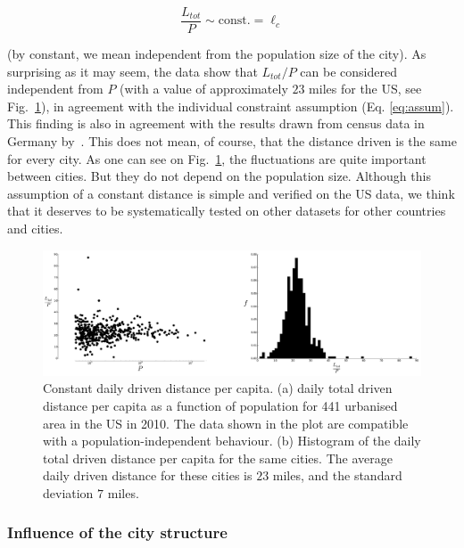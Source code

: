 \begin{equation} 
    \frac{L_{tot}}{P} \sim \text{const.} = \ell_c 
    \label{eq:assum}
\end{equation}

(by constant, we mean independent from the population size of the city). As
surprising as it may seem, the data show that $L_{tot}/P$ can be considered
 independent from $P$ (with a value of approximately $23$ miles for
the US, see Fig.~\ref{fig:LtotoverP}), in agreement with the individual
constraint assumption (Eq. \ref{eq:assum}). This finding is also in agreement
with the results drawn from census data in Germany by~\cite{Wilkerson:2013}.
This does not mean, of course, that the distance driven is the same for every
city. As one can see on Fig.~\ref{fig:LtotoverP}, the fluctuations are quite
important between cities. But they do not depend on the population size.
Although this assumption of a constant distance is simple and verified on the US
data, we think that it deserves to be systematically tested on other datasets
for other countries and cities. 

\begin{figure}[!h]
    \includegraphics[width=1.0\textwidth]{gfx/chapter-scaling/figure_2.pdf}
    \caption{Constant daily driven distance per capita. (a) daily total driven
        distance per capita as a function of population for 441 urbanised area
        in the US in 2010. The data shown in the plot are compatible with a
    population-independent behaviour. (b) Histogram of the daily total driven
distance per capita for the same cities. The average daily driven distance for
these cities is $23$ miles, and the standard deviation $7$ miles.}
\label{fig:LtotoverP} 
\end{figure}



\subsubsection{Influence of the city structure}
\label{sub:influence_of_the_city_structure}

